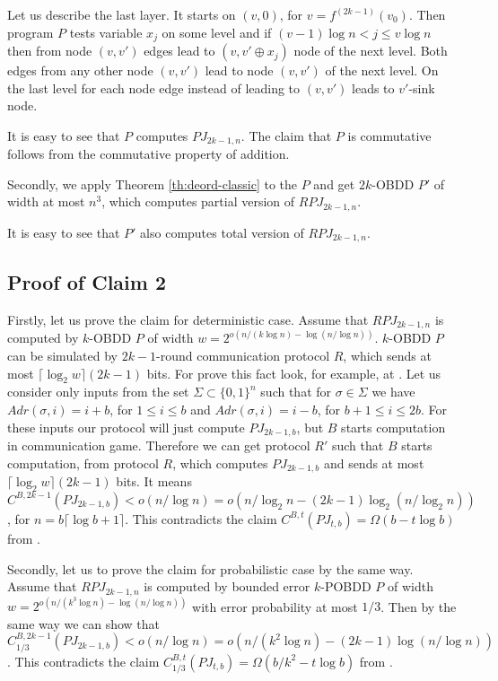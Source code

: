 \documentclass{llncs}
\begin{document}
Let us describe the last layer. It starts on $(v,0)$, for $v=f^{(2k-1)}(v_0)$. Then program $P$ tests variable $x_j$ on some level and if $(v-1)\log n <j\leq v\log n$ then from node $(v,v')$ edges lead to $(v, v' \oplus x_j)$ node of the next level. Both edges from any other node $(v,v')$ lead to node $(v,v')$ of the next level. On the last level for each node edge instead of leading to $(v,v')$ leads to $v'$-sink node.

It is easy to see that $P$ computes $PJ_{2k-1,n}$. The claim that $P$ is commutative follows from the commutative property of addition.

Secondly, we apply Theorem \ref{th:deord-classic} to the $P$ and get $2k$-OBDD $P'$ of width at most $n^3$, which computes partial version of $RPJ_{2k-1,n}$.

It is easy to see that $P'$ also computes total version of $RPJ_{2k-1,n}$.

\subsection{Proof of Claim 2}

Firstly, let us prove the claim for deterministic case. Assume that $RPJ_{2k-1,n}$ is computed by $k$-OBDD $P$ of width $w=2^{o(n/(k\log n)-\log (n/\log n))}$. $k$-OBDD $P$ can be simulated by $2k-1$-round communication protocol $R$, which sends at most $\lceil\log_2w\rceil(2k-1)$ bits. For prove this fact look, for example, at \cite{K16}. Let us consider only inputs from the set $\Sigma\subset\{0,1\}^n$ such that for $\sigma\in\Sigma$ we have $Adr(\sigma,i)=i+b$, for $1\leq i\leq b$ and $Adr(\sigma,i)=i-b$, for $b+1\leq i\leq 2b$. For these inputs our protocol will just compute $PJ_{2k-1,b}$, but $B$ starts computation in communication game. Therefore we can get protocol $R'$ such that $B$ starts computation, from protocol $R$, which computes  $PJ_{2k-1,b}$ and sends at most  $\lceil\log_2w\rceil(2k-1)$ bits. It means $C^{B,2k-1}(PJ_{2k-1,b})<o(n/\log n)=o(n/\log_2 n-(2k-1)\log_2 (n/\log_2 n))$, for $n=b\lceil \log{b}+1 \rceil$. This contradicts the claim $C^{B,t}(PJ_{t,b})=\Omega(b - t\log {b})$ from   \cite{nw91}.  

Secondly, let us to prove the claim for probabilistic case by the same way. Assume that $RPJ_{2k-1,n}$ is computed by bounded error $k$-POBDD $P$ of width $w=2^{o( n/(k^3\log n)  - \log(n/\log n))}$ with error probability at most $1/3$. Then by the same way we can show that $C^{B,2k-1}_{1/3}(PJ_{2k-1,b})<o(n/\log n)=o( n/(k^2\log n)  - (2k-1)\log(n/\log n))$.  This contradicts the claim $C^{B,t}_{1/3}(PJ_{t,b})=\Omega(b/k^2 - t\log{b})$ from   \cite{nw91}. 
\end{document}
